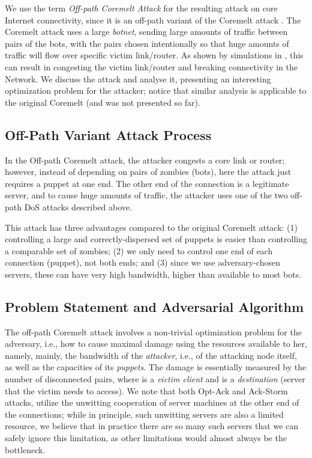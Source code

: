 \documentclass[conference]{IEEEtran}
\newcommand{\ignore}[1]{}
\begin{document}
We use the term {\em Off-path Coremelt Attack} for the resulting attack on core Internet connectivity, since it is an off-path variant of the Coremelt attack \cite{conf/esorics/StuderP09}. The Coremelt attack uses a large {\em botnet}, sending large amounts of traffic between pairs of the bots, with the pairs chosen intentionally so that huge amounts of traffic will flow over specific victim link/router. As shown by simulations in \cite{conf/esorics/StuderP09}, this can result in congesting the victim link/router and breaking connectivity in the Network. We discuss the attack and analyse it, presenting an interesting optimization problem for the attacker; notice that similar analysis is applicable to the original Coremelt (and was not presented so far).

\ignore{
Our evaluation of the off-path Coremelt attack will includes use simulations, extending on these of \cite{conf/esorics/StuderP09} (and comparing to their results); while we already have interesting results, we feel that this part of our study still is not ready for publication, and furthermore, there is not enough space in this submission to justify including these.}

\subsection{Off-Path Variant Attack Process}
In the Off-path Coremelt attack, the attacker congests a core link or router; however, instead of depending on pairs of zombies (bots), here the attack just requires a puppet at one end. The other end of the connection is a legitimate server, and to cause huge amounts of traffic, the attacker uses one of the two off-path DoS attacks described above. 

This attack has three advantages compared to the original Coremelt attack: (1) controlling a large and correctly-dispersed set of puppets is easier than controlling a comparable set of zombies; (2) we only need to control one end of each connection (puppet), not both ends; and (3) since we use adversary-chosen servers, these can have very high bandwidth, higher than available to most bots.  

\subsection{Problem Statement and Adversarial Algorithm}
The off-path Coremelt attack involves a non-trivial optimization problem for the adversary, i.e., how to cause maximal damage using the resources available to her, namely, mainly, the bandwidth of the {\em attacker}, i.e., of the attacking node itself, as well as the capacities of its {\em puppets}. The damage is essentially measured by the number of disconnected  pairs, where  is a {\em victim client} and  is a {\em destination} (server that the victim needs to access). We note that both Opt-Ack and Ack-Storm attacks, utilize the unwitting cooperation of server machines at the other end of the connections; while in principle, such unwitting servers are also a limited resource, we believe that in practice there are so many such servers that we can safely ignore this limitation, as other limitations would almost always be the bottleneck. 
 
\end{document}
